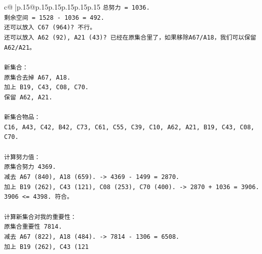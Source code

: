 \documentclass{article}
\begin{document}
{\begin{supertabular}{c@{$\;$}|p{.15\linewidth}@{}p{.15\linewidth}p{.15\linewidth}p{.15\linewidth}p{.15\linewidth}p{.15\linewidth}}
{{{\texttt{总努力 = 1036.} \\
\texttt{剩余空间 = 1528 {-} 1036 = 492.} \\
\texttt{还可以放入 C67 (964)? 不行。} \\
\texttt{还可以放入 A62 (92), A21 (43)? 已经在原集合里了，如果移除A67/A18，我们可以保留A62/A21。} \\
\\ 
\texttt{新集合：} \\
\texttt{原集合去掉 A67, A18.} \\
\texttt{加上 B19, C43, C08, C70.} \\
\texttt{保留 A62, A21.} \\
\\ 
\texttt{新集合物品：} \\
\texttt{C16, A43, C42, B42, C73, C61, C55, C39, C10, A62, A21, B19, C43, C08, C70.} \\
\\ 
\texttt{计算努力值：} \\
\texttt{原集合努力 4369.} \\
\texttt{减去 A67 (840), A18 (659). {-}> 4369 {-} 1499 = 2870.} \\
\texttt{加上 B19 (262), C43 (121), C08 (253), C70 (400). {-}> 2870 + 1036 = 3906.} \\
\texttt{3906 <= 4398. 符合。} \\
\\ 
\texttt{计算新集合对我的重要性：} \\
\texttt{原集合重要性 7814.} \\
\texttt{减去 A67 (822), A18 (484). {-}> 7814 {-} 1306 = 6508.} \\
\texttt{加上 B19 (262), C43 (121} \\
            }
        }
    }
     \\ \\


\end{supertabular}}
\end{document}
